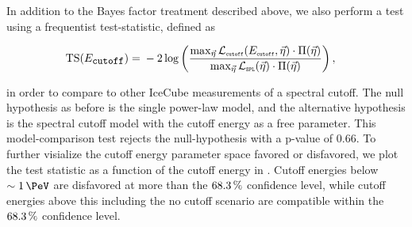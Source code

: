 In addition to the Bayes factor treatment described above, we also perform a test using a frequentist test-statistic, defined as
\begin{linenomath*}
	\begin{equation}
	\begin{split}
	\mathrm{TS}(E_\texttt{\small{cutoff}}) ={}& -2\log\left({\frac{\max_{\vec\eta}\mathcal{L}_\texttt{\tiny{cutoff}}(E_\texttt{\tiny{cutoff}},\vec\eta)\cdot\Pi(\vec\eta)}{\max_{\vec\eta}\mathcal{L}_\texttt{\tiny{SPL}}(\vec\eta)\cdot\Pi(\vec\eta)}}\right),
	\end{split}\label{eq:cutoff_ts}
	\end{equation}
\end{linenomath*}
in order to compare to other IceCube measurements of a spectral cutoff.
The null hypothesis as before is the single power-law model, and the alternative hypothesis is the spectral cutoff model with the cutoff energy as a free parameter.
This model-comparison test rejects the null-hypothesis with a p-value of $0.66$.
To further visialize the cutoff energy parameter space favored or disfavored, we plot the test statistic as a function of the cutoff energy in .
Cutoff energies below $\sim\SI{1}\PeV$ are disfavored at more than the $\SI{68.3}\percent$ confidence level, while cutoff energies above this including the no cutoff scenario are compatible within the $\SI{68.3}\percent$ confidence level.

